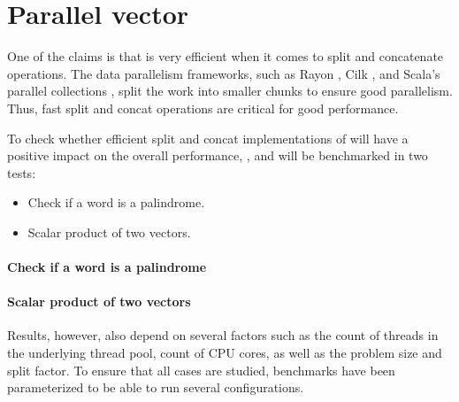 \section{Parallel vector}
One of the claims is that \rrbvec{} is very efficient when it comes to split and concatenate operations. The data parallelism frameworks, such as Rayon , Cilk , and Scala's parallel collections , split the work into smaller chunks to ensure good parallelism. Thus, fast split and concat operations are critical for good performance. 

To check whether efficient split and concat implementations of \rrbvec{} will have a positive impact on the overall performance, \rrbvec{}, \rbvec{} and \stdvec{} will be benchmarked in two tests:

\begin{itemize}
    \item Check if a word is a palindrome. 
    \item Scalar product of two vectors.
\end{itemize}

\paragraph*{Check if a word is a palindrome}

\paragraph*{Scalar product of two vectors}

Results, however, also depend on several factors such as the count of threads in the underlying thread pool, count of CPU cores, as well as the problem size and split factor. To ensure that all cases are studied, benchmarks have been parameterized to be able to run several configurations. 




